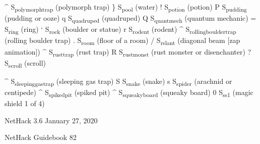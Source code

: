 \documentclass[11pt]{article}
\begin{document}
\^{} S\textsubscript{polymorph}\textsubscript{trap}    (polymorph trap)
\} S\textsubscript{pool}         (water)
! S\textsubscript{potion}        (potion)
P S\textsubscript{pudding}       (pudding or ooze)
q S\textsubscript{quadruped}      (quadruped)
Q S\textsubscript{quantmech}      (quantum mechanic)
= S\textsubscript{ring}         (ring)
` S\textsubscript{rock}         (boulder or statue)
r S\textsubscript{rodent}        (rodent)
\^{} S\textsubscript{rolling}\textsubscript{boulder}\textsubscript{trap} (rolling boulder trap)
. S\textsubscript{room}         (floor of a room)
/ S\textsubscript{rslant}        (diagonal beam [zap animation])
\^{} S\textsubscript{rust}\textsubscript{trap}      (rust trap)
R S\textsubscript{rustmonst}      (rust monster or disenchanter)
? S\textsubscript{scroll}        (scroll)

\^{} S\textsubscript{sleeping}\textsubscript{gas}\textsubscript{trap}  (sleeping gas trap)
S S\textsubscript{snake}        (snake)
s S\textsubscript{spider}        (arachnid or centipede)
\^{} S\textsubscript{spiked}\textsubscript{pit}      (spiked pit)
\^{} S\textsubscript{squeaky}\textsubscript{board}    (squeaky board)
0 S\textsubscript{ss1}         (magic shield 1 of 4)



NetHack 3.6                   January 27, 2020





NetHack Guidebook                       82
\end{document}
